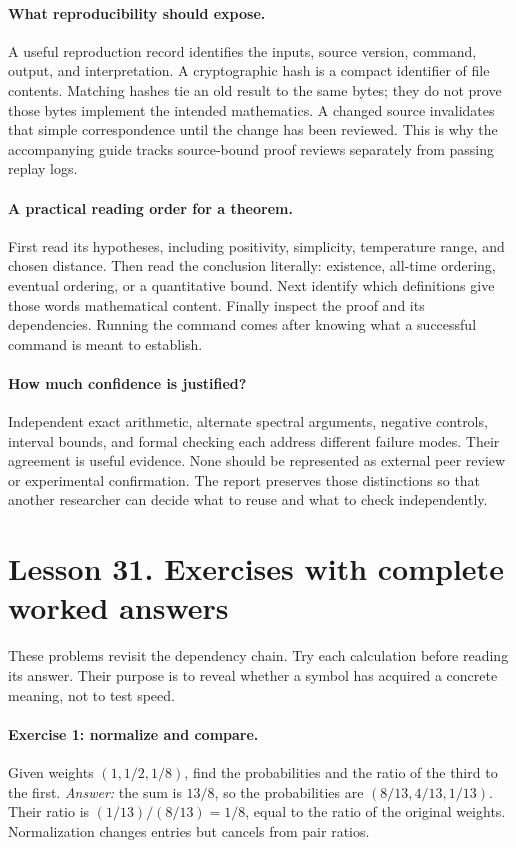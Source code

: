 \documentclass[11pt]{article}
\begin{document}
\paragraph{What reproducibility should expose.}
A useful reproduction record identifies the inputs, source version, command,
output, and interpretation. A cryptographic hash is a compact identifier
of file contents. Matching hashes tie an old result to the same bytes;
they do not prove those bytes implement the intended mathematics. A changed
source invalidates that simple correspondence until the change has been
reviewed. This is why the accompanying guide tracks source-bound proof
reviews separately from passing replay logs.

\paragraph{A practical reading order for a theorem.}
First read its hypotheses, including positivity, simplicity, temperature
range, and chosen distance. Then read the conclusion literally: existence,
all-time ordering, eventual ordering, or a quantitative bound. Next identify
which definitions give those words mathematical content. Finally inspect
the proof and its dependencies. Running the command comes after knowing
what a successful command is meant to establish.

\paragraph{How much confidence is justified?}
Independent exact arithmetic, alternate spectral arguments, negative
controls, interval bounds, and formal checking each address different
failure modes. Their agreement is useful evidence. None should be
represented as external peer review or experimental confirmation. The
report preserves those distinctions so that another researcher can decide
what to reuse and what to check independently.

\clearpage
\section*{Lesson 31. Exercises with complete worked answers}
These problems revisit the dependency chain. Try each calculation before
reading its answer. Their purpose is to reveal whether a symbol has acquired
a concrete meaning, not to test speed.

\paragraph{Exercise 1: normalize and compare.}
Given weights $(1,1/2,1/8)$, find the probabilities and the ratio of the
third to the first. \emph{Answer:} the sum is $13/8$, so the probabilities
are $(8/13,4/13,1/13)$. Their ratio is $(1/13)/(8/13)=1/8$, equal to the
ratio of the original weights. Normalization changes entries but cancels
from pair ratios.
\end{document}

